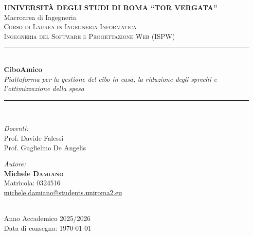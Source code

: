 \documentclass[12pt,a4paper,oneside]{report}
\begin{document}
\begin{titlepage}
    \centering
    \large
    \textbf{UNIVERSITÀ DEGLI STUDI DI ROMA ``TOR VERGATA''} \\[0.3cm]
    \large Macroarea di Ingegneria \\[1.2cm]

    \scshape\Large Corso di Laurea in Ingegneria Informatica \\[0.3cm]
    \large Ingegneria del Software e Progettazione Web (ISPW) \\[1.5cm]

    \rule{\linewidth}{0.4mm} \\[0.4cm]
    {\huge\bfseries CiboAmico} \\[0.3cm]
    \large\itshape Piattaforma per la gestione del cibo in casa, la riduzione degli sprechi e l'ottimizzazione della spesa \\
    \rule{\linewidth}{0.4mm} \\[1.5cm]

    \begin{minipage}{0.5\textwidth}
        \begin{flushleft} \large
            \emph{Docenti:} \\
            Prof. Davide Falessi \\
            Prof. Guglielmo De Angelis
        \end{flushleft}
    \end{minipage}
    \hfill
    \begin{minipage}{0.42\textwidth}
        \begin{flushright} \large
            \emph{Autore:} \\
            \textbf{Michele \textsc{Damiano}} \\
            Matricola: 0324516 \\
            \href{mailto:michele.damiano@students.uniroma2.eu}{\small michele.damiano@students.uniroma2.eu}
        \end{flushright}
    \end{minipage} \\[2.5cm]

    \vfill
    {\large Anno Accademico 2025/2026} \\[0.2cm]
    {\large Data di consegna: \today}
\end{titlepage}

\tableofcontents
\newpage








\end{document}
